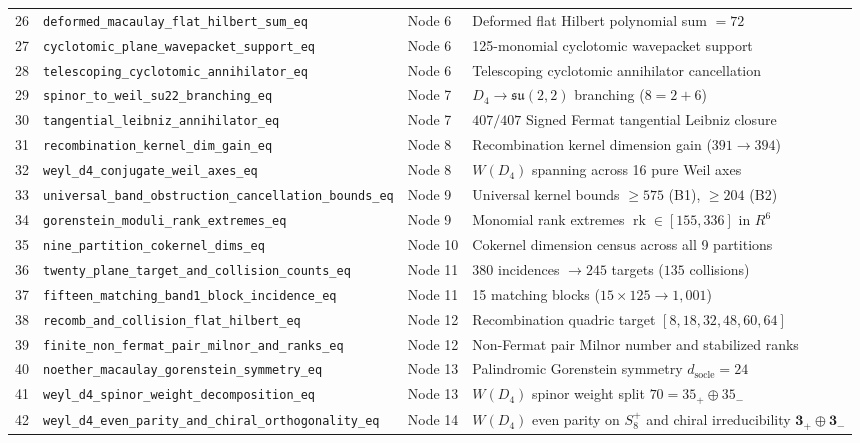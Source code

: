 \documentclass[11pt,a4paper]{article}
\theoremstyle{definition}
\theoremstyle{remark}
\DeclareMathOperator{\rk}{rk}
\begin{document}
{\begin{longtable}{r >{\ttfamily\scriptsize}p{6.4cm} l p{6.8cm}}
26 & \texttt{deformed\_macaulay\_flat\_hilbert\_sum\_eq} & Node 6 & Deformed flat Hilbert polynomial sum $= 72$ \\
27 & \texttt{cyclotomic\_plane\_wavepacket\_support\_eq} & Node 6 & 125-monomial cyclotomic wavepacket support \\
28 & \texttt{telescoping\_cyclotomic\_annihilator\_eq} & Node 6 & Telescoping cyclotomic annihilator cancellation \\
29 & \texttt{spinor\_to\_weil\_su22\_branching\_eq} & Node 7 & $D_4 \to \mathfrak{su}(2,2)$ branching ($8 = 2 + 6$) \\
30 & \texttt{tangential\_leibniz\_annihilator\_eq} & Node 7 & $407/407$ Signed Fermat tangential Leibniz closure \\
31 & \texttt{recombination\_kernel\_dim\_gain\_eq} & Node 8 & Recombination kernel dimension gain ($391 \to 394$) \\
32 & \texttt{weyl\_d4\_conjugate\_weil\_axes\_eq} & Node 8 & $W(D_4)$ spanning across 16 pure Weil axes \\
33 & \texttt{universal\_band\_obstruction\_cancellation\_bounds\_eq} & Node 9 & Universal kernel bounds $\ge 575$ (B1), $\ge 204$ (B2) \\
34 & \texttt{gorenstein\_moduli\_rank\_extremes\_eq} & Node 9 & Monomial rank extremes $\rk \in [155, 336]$ in $R^6$ \\
35 & \texttt{nine\_partition\_cokernel\_dims\_eq} & Node 10 & Cokernel dimension census across all 9 partitions \\
36 & \texttt{twenty\_plane\_target\_and\_collision\_counts\_eq} & Node 11 & $380$ incidences $\to 245$ targets ($135$ collisions) \\
37 & \texttt{fifteen\_matching\_band1\_block\_incidence\_eq} & Node 11 & 15 matching blocks ($15 \times 125 \to 1,001$) \\
38 & \texttt{recomb\_and\_collision\_flat\_hilbert\_eq} & Node 12 & Recombination quadric target $[8,18,32,48,60,64]$ \\
39 & \texttt{finite\_non\_fermat\_pair\_milnor\_and\_ranks\_eq} & Node 12 & Non-Fermat pair Milnor number and stabilized ranks \\
40 & \texttt{noether\_macaulay\_gorenstein\_symmetry\_eq} & Node 13 & Palindromic Gorenstein symmetry $d_{\mathrm{socle}}=24$ \\
41 & \texttt{weyl\_d4\_spinor\_weight\_decomposition\_eq} & Node 13 & $W(D_4)$ spinor weight split $70 = 35_+ \oplus 35_-$ \\
42 & \texttt{weyl\_d4\_even\_parity\_and\_chiral\_orthogonality\_eq} & Node 14 & $W(D_4)$ even parity on $S^+_8$ and chiral irreducibility $\mathbf{3}_+ \oplus \mathbf{3}_-$ \\

\end{longtable}}
\end{document}

